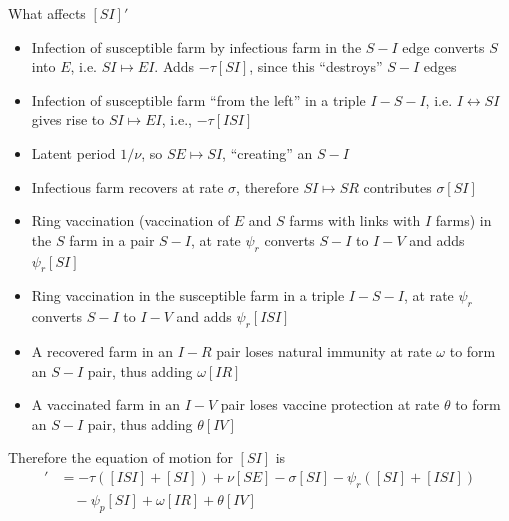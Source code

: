 \documentclass[aspectratio=43]{beamer}
\begin{document}
\begin{frame}{What affects $[SI]'$}
	\begin{itemize}
		\item Infection of susceptible farm by infectious farm in the
		$S-I$ edge converts $S$ into $E$, i.e. $SI\mapsto EI$. Adds $-\tau[SI]$, since this ``destroys'' $S-I$ edges
		\item Infection of susceptible farm ``from the left'' in a triple $I-S-I$,
		i.e. $I\leftrightarrow SI$ gives rise to $SI\mapsto EI$, i.e., $-\tau[ISI]$
		\item Latent period $1/\nu$, so $SE\mapsto SI$, ``creating'' an $S-I$
		\item Infectious farm recovers at rate $\sigma$, therefore $SI\mapsto SR$ contributes $\sigma[SI]$ 
		\item Ring vaccination (vaccination of $E$ and $S$ farms with links with $I$ farms) in the $S$ farm in a pair $S-I$, at rate $\psi_r$ converts $S-I$ to $I-V$ and adds $\psi_r[SI]$
		\item Ring vaccination in the susceptible farm in a triple $I-S-I$, at rate
		$\psi_r$ converts $S-I$ to $I-V$ and adds $\psi_r[ISI]$
		\item A recovered farm in an $I-R$ pair loses natural immunity at rate
		$\omega$ to form an $S-I$ pair, thus adding $\omega[IR]$
		\item A vaccinated farm in an $I-V$ pair loses vaccine protection at rate $\theta$ to form an $S-I$ pair, thus adding $\theta[IV]$
	\end{itemize}
\end{frame}

\begin{frame}
Therefore the equation of motion for $[SI]$ is
\begin{align*}
	[SI]' &= -\tau([ISI]+[SI])+\nu[SE]-\sigma[SI]-\psi_r([SI]+[ISI])\\
	&\quad -\psi_p[SI]+\omega[IR]+\theta[IV]
\end{align*}
\end{frame}



\end{document}
